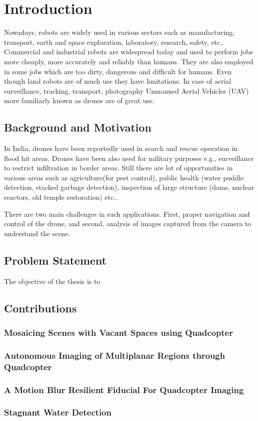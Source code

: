 \chapter{Introduction}
\label{ch:intro}
Nowadays, robots are widely used in various sectors such as manufacturing,
transport, earth and space exploration, laboratory, research, safety, etc..
Commercial and industrial robots are widespread today and used to perform jobs
more cheaply, more accurately and reliably than humans. They are also
employed in some jobs which are too dirty, dangerous and difficult for humans.
Even though land robots are of much use they have limitations. In case of
aerial surveillance, tracking, transport, photography Unmanned Aerial Vehicles
(UAV) more familiarly known as drones are of great use.
\section{Background and Motivation}
In India, drones have been reportedly used in search and rescue operation in
flood hit areas. Drones have been also used for military purposes e.g.,
surveillance to restrict infiltration in border areas. Still there are lot
of opportunities in various areas such as agriculture(for pest control),
public health (water puddle detection, stacked garbage detection), inspection
of large structure (dams, nuclear reactors, old temple restoration) etc..

There are two main challenges in such applications. First, proper navigation
and control of the drone, and second, analysis of images captured from the
camera to understand the scene. 
\section{Problem Statement}
The objective of the thesis is to
\section{Contributions}
\subsection{Mosaicing Scenes with Vacant Spaces using Quadcopter}
\subsection{Autonomous Imaging of Multiplanar Regions through Quadcopter}
\subsection{A Motion Blur Resilient Fiducial For Quadcopter Imaging}
\subsection{Stagnant Water Detection}

